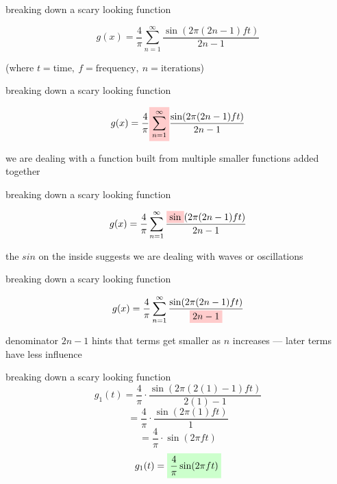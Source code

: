 \documentclass{beamer}
\begin{document}
	\begin{frame}{breaking down a scary looking function}
		\vfill
		\begin{center}
			$$g(x)=\frac{4}{\pi}\sum_{n=1}^{\infty}\frac{\sin(2\pi (2n-1)ft)}{2n-1}$$
		\end{center}
		\vfill
		\begin{center}
			\small (where $t = \text{time},\ f = \text{frequency},\ n = \text{iterations}$)
		\end{center}
		\vfill
	\end{frame}

	
	\begin{frame}{breaking down a scary looking function}
		\vfill
		\begin{center}
			$$g(x) = \frac{4}{\pi}\colorbox{red!20}{$\displaystyle \sum_{n=1}^{\infty}$}\frac{\sin(2\pi(2n-1)ft)}{2n-1}$$
		\end{center}
		\vfill
		\begin{center}
			we are dealing with a function built from multiple smaller functions added together
		\end{center}
		\vfill
	\end{frame}

	
	\begin{frame}{breaking down a scary looking function}
		\vfill
		\begin{center}
			$$g(x)=\frac{4}{\pi}\sum_{n=1}^{\infty}\frac{\colorbox{red!20}{$\displaystyle \sin$}(2\pi (2n-1)ft)}{2n-1}$$
		\end{center}
		\vfill
		\begin{center}
			the $sin$ on the inside suggests we are dealing with waves or oscillations
		\end{center}
		\vfill
	\end{frame}
	
	\begin{frame}{breaking down a scary looking function}
		\vfill
		\begin{center}
			$$g(x)=\frac{4}{\pi}\sum_{n=1}^{\infty}\frac{\sin(2\pi (2n-1)ft)}{\colorbox{red!20}{$\displaystyle 2n-1$}}$$
		\end{center}
		\vfill
		\begin{center}
			denominator \(2n-1\) hints that terms get smaller as \(n\) increases — later terms have less influence
		\end{center}
		\vfill
	\end{frame}

	
	\begin{frame}{breaking down a scary looking function}
		$$g_{1}(t)=\frac{4}{\pi}\cdot \frac{\sin(2\pi (2(1)-1)ft)}{2(1)-1}$$
		$$=\frac{4}{\pi}\cdot \frac{\sin(2\pi (1)ft)}{1}$$
		$$=\frac{4}{\pi}\cdot\sin(2\pi ft)$$
		$$g_{1}(t)=\colorbox{green!20}{$\displaystyle \frac{4}{\pi}\sin(2\pi ft)$}$$
	\end{frame}
	
\end{document}
